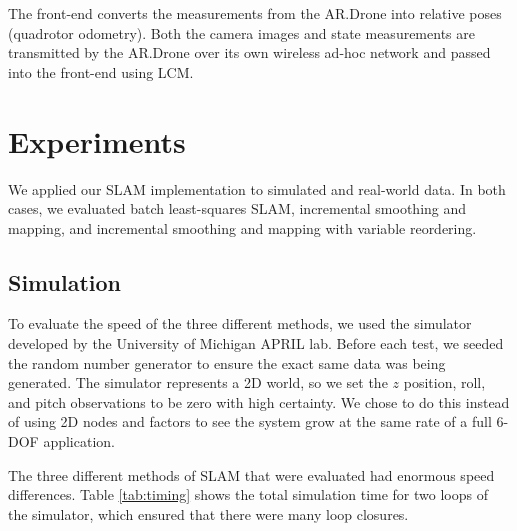 \documentclass[conference]{IEEEtran}
\begin{document}

The front-end converts the measurements from the AR.Drone into relative poses (quadrotor
odometry). Both the camera images and state measurements are transmitted by the AR.Drone
over its own wireless ad-hoc network and passed into the front-end using LCM.


\section{Experiments}
\label{sec:experiments}

We applied our \ac{SLAM} implementation to simulated and real-world data. In both cases, we
evaluated batch least-squares \ac{SLAM}, incremental smoothing and mapping, and incremental
smoothing and mapping with variable reordering. 

\subsection{Simulation}
\label{sub:simulation}


To evaluate the speed of the three different methods, we used the simulator developed by
the University of Michigan APRIL lab. Before each test, we seeded the random number
generator to ensure the exact same data was being generated. The simulator represents a 2D
world, so we set the $z$ position, roll, and pitch observations to be zero with high
certainty. We chose to do this instead of using 2D nodes and factors to see the system
grow at the same rate of a full 6-\ac{DOF} application.

The three different methods of \ac{SLAM} that were evaluated had enormous speed
differences. Table \ref{tab:timing} shows the total simulation time for two loops of the
simulator, which ensured that there were many loop closures.
\end{document}
